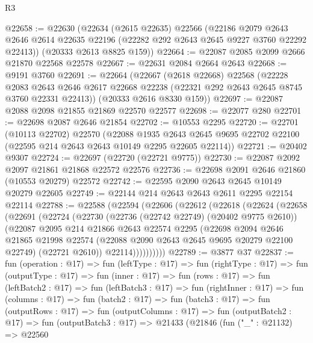 \begin{lexlean}{R3}
\begin{coremodule}
@22658 := @22630
    (@22634
      (@2615 @22635)
      @22566
      (@22186
        @2079
        @2643
        @2646
        @2614
        @22635
        @22196
        (@22282 @292 @2643 @2645 @9227 @3760 @22292 @22413))
      (@20333 @2613 @8825 @159))
@22664 := @22087 @2085 @2099 @2666 @21870 @22568 @22578
@22667 := @22631 @2084 @2664 @2643
@22668 := @9191 @3760
@22691 := @22664
    (@22667
      (@2618 @22668)
      @22568
      (@22228
        @2083
        @2643
        @2646
        @2617
        @22668
        @22238
        (@22321 @292 @2643 @2645 @8745 @3760 @22331 @22413))
      (@20333 @2616 @8330 @159))
@22697 := @22087 @2088 @2098 @21855 @21869 @22570 @22577
@22698 := @22077 @280
@22701 := @22698 @2087 @2646 @21854
@22702 := @10553 @2295
@22720 := @22701
    (@10113 @22702)
    @22570
    (@22088
      @1935
      @2643
      @2645
      @9695
      @22702
      @22100
      (@22595 @214 @2643 @2643 @10149 @2295 @22605 @22114))
@22721 := @20402 @9307
@22724 := @22697 (@22720 (@22721 @9775))
@22730 := @22087 @2092 @2097 @21861 @21868 @22572 @22576
@22736 := @22698 @2091 @2646 @21860 (@10553 @20279) @22572
@22742 := @22595 @2090 @2643 @2645 @10149 @20279 @22605
@22749 := @22144 @214 @2643 @2643 @2611 @2295 @22154 @22114
@22788 := @22588
    (@22594
      (@22606
        (@22612
          (@22618
            (@22624
              (@22658
                (@22691
                  (@22724
                    (@22730
                      (@22736 (@22742 @22749) (@20402 @9775 @2610))
                      (@22087
                        @2095
                        @214
                        @21866
                        @2643
                        @22574
                        @2295
                        (@22698
                          @2094
                          @2646
                          @21865
                          @21998
                          @22574
                          (@22088 @2090 @2643 @2645 @9695 @20279 @22100 @22749)
                          (@22721 @2610))
                        @22114))))))))))
@22789 := @3877 @37
@22837 := fun (operation : @17) =>
  fun (leftType : @17) =>
  fun (rightType : @17) =>
  fun (outputType : @17) =>
  fun (inner : @17) =>
  fun (rows : @17) =>
  fun (leftBatch2 : @17) =>
  fun (leftBatch3 : @17) =>
  fun (rightInner : @17) =>
  fun (columns : @17) =>
  fun (batch2 : @17) =>
  fun (batch3 : @17) =>
  fun (outputRows : @17) =>
  fun (outputColumns : @17) =>
  fun (outputBatch2 : @17) =>
  fun (outputBatch3 : @17) =>
  @21433
    (@21846
      (fun ("_" : @21132) =>
      @22560

\end{coremodule}
\end{lexlean}
